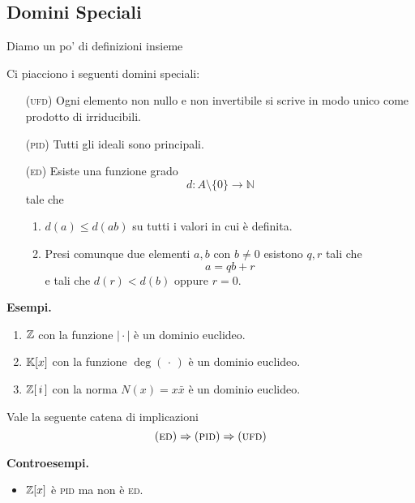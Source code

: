 \newpage
\subsection{Domini Speciali}
\begin{multicols}{2}
	Diamo un po' di definizioni insieme
	\begin{definition}
		Ci piacciono i seguenti domini speciali:
		\begin{itemize}
			\item [(\textsc{ufd})] Ogni elemento non nullo e non invertibile si scrive in modo unico come prodotto di irriducibili.
			
			\item [(\textsc{pid})] Tutti gli ideali sono principali.
			
			\item [(\textsc{ed})] Esiste una funzione grado \[{d}:{A\setminus\{0\}}\to{\mathbb{N}}\]
			tale che 
			\begin{enumerate}
				\item $ d(a) \leq d(ab) $ su tutti i valori in cui è definita.
				\item Presi comunque due elementi $ a, b $ con $ b \neq 0 $ esistono $ q, r $ tali che
				\[ a = qb + r \]
				e tali che $ d(r) < d(b) $ oppure $ r = 0 $.
			\end{enumerate}
			
		\end{itemize}
	\end{definition}

\textbf{Esempi.}
\begin{enumerate}
	\item $ \mathbb{Z} $ con la funzione $ \mid \cdot\mid $ è un dominio euclideo.
	\item $ \mathbb{K}[x] $ con la funzione $ \deg(\,\cdot\,) $ è un dominio euclideo.
	\item $ \mathbb{Z}[\,i\,] $ con la norma $ N(x) = x\bar{x} $ è un dominio euclideo.
\end{enumerate}

\begin{theorem}
	Vale la seguente catena di implicazioni
	\[ (\textsc{ed})\Rightarrow(\textsc{pid})\Rightarrow(\textsc{ufd}) \]
\end{theorem}
	
\textbf{Controesempi.}
\begin{itemize}
	\item $ \mathbb{Z}[x] $ è \textsc{pid} ma non è \textsc{ed}.
\end{itemize}
	

\end{multicols}
